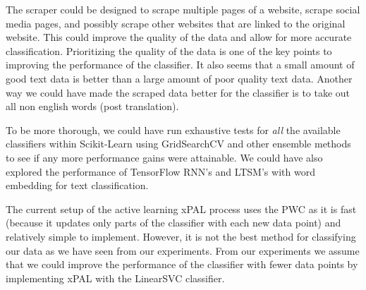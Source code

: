 The scraper could be designed to scrape multiple pages of a website, scrape social media pages, and possibly scrape other websites that are linked to the original website. This could improve the quality of the data and allow for more accurate classification. Prioritizing the quality of the data is one of the key points to improving the performance of the classifier. It also seems that a small amount of good text data is better than a large amount of poor quality text data. Another way we could have made the scraped data better for the classifier is to take out all non english words (post translation).

To be more thorough, we could have run exhaustive tests for \textit{all} the available classifiers within Scikit-Learn using GridSearchCV and other ensemble methods to see if any more performance gains were attainable. We could have also explored the performance of TensorFlow RNN's and LTSM's with word embedding for text classification.

The current setup of the active learning xPAL process uses the PWC as it is fast (because it updates only parts of the classifier with each new data point) and relatively simple to implement. However, it is not the best method for classifying our data as we have seen from our experiments. From our experiments we assume that we could improve the performance of the classifier with fewer data points by implementing xPAL with the LinearSVC classifier.

